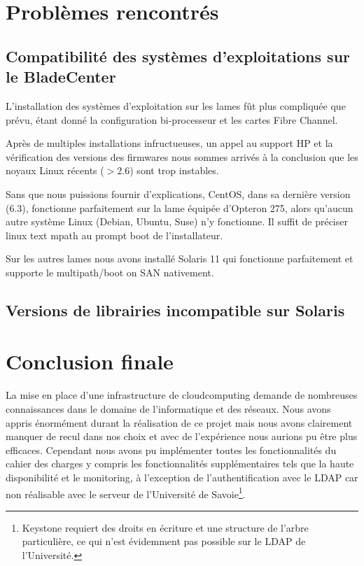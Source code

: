 \documentclass[a4paper,oneside]{report}
\begin{document}
\chapter{Problèmes rencontrés}
\section{Compatibilité des systèmes d'exploitations sur le BladeCenter}
\label{sec:compatblade}
L'installation des systèmes d'exploitation sur les lames fût plus compliquée que prévu, étant donné la configuration bi-processeur et les cartes Fibre Channel.

Après de multiples installations infructueuses, un appel au support HP et la vérification des versions des firmwares nous sommes arrivés à la conclusion que les noyaux Linux récents ($ > 2.6 $) sont trop instables.

Sans que nous puissions fournir d'explications, CentOS, dans sa dernière version (6.3), fonctionne parfaitement sur la lame équipée d'Opteron 275, alors qu'aucun autre système Linux (Debian, Ubuntu, Suse) n'y fonctionne.
Il suffit de préciser linux text mpath au prompt boot de l'installateur.

Sur les autres lames nous avons installé Solaris 11 qui fonctionne parfaitement et supporte le multipath/boot on SAN nativement.

\section{Versions de librairies incompatible sur Solaris}
\label{sec:libsolaris}

\chapter{Conclusion finale}
La mise en place d'une infrastructure de \gls{cloudcomputing} demande de nombreuses connaissances dans le domaine de l'informatique et des réseaux.
Nous avons appris énormément durant la réalisation de ce projet mais nous avons clairement manquer de recul dans nos choix et avec de l'expérience nous aurions pu être plus efficaces.\newline
Cependant nous avons pu implémenter toutes les fonctionnalités du cahier des charges y compris les fonctionnalités supplémentaires tels que la haute disponibilité et le monitoring, à l'exception de l'authentification avec le LDAP car non réalisable avec le serveur de l'Université de Savoie\footnote{Keystone requiert des droits en écriture et une structure de l'arbre particulière, ce qui n'est évidemment pas possible sur le LDAP de l'Université.}.
\end{document}
